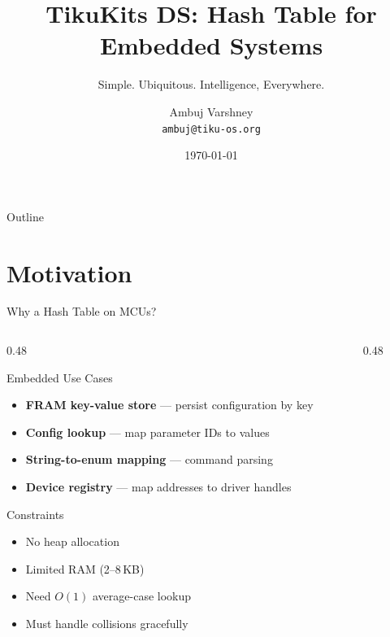 \documentclass[aspectratio=169, 10pt]{beamer}
\title[TikuKits DS]{TikuKits DS: Hash Table for Embedded Systems}
\subtitle{Simple. Ubiquitous. Intelligence, Everywhere.}
\author[Ambuj Varshney]{Ambuj Varshney \\ \texttt{ambuj@tiku-os.org}}
\date{\today}
\begin{document}
\begin{frame}
\titlepage
\end{frame}

\begin{frame}{Outline}
\tableofcontents
\end{frame}

\section{Motivation}

\begin{frame}{Why a Hash Table on MCUs?}
\begin{columns}[T]
\begin{column}{0.48\textwidth}
\begin{block}{Embedded Use Cases}
\begin{itemize}
  \item \textbf{FRAM key-value store} --- persist configuration by key
  \item \textbf{Config lookup} --- map parameter IDs to values
  \item \textbf{String-to-enum mapping} --- command parsing
  \item \textbf{Device registry} --- map addresses to driver handles
\end{itemize}
\end{block}

\begin{block}{Constraints}
\begin{itemize}
  \item No heap allocation
  \item Limited RAM (2--8\,KB)
  \item Need $O(1)$ average-case lookup
  \item Must handle collisions gracefully
\end{itemize}
\end{block}
\end{column}

\begin{column}{0.48\textwidth}
\begin{center}
\end{center}
\end{column}
\end{columns}
\end{frame}
\end{document}
